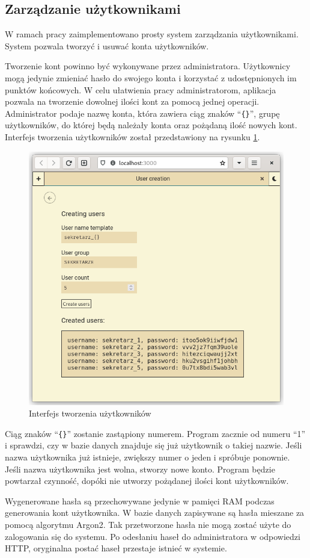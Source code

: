 \subsection{Zarządzanie użytkownikami}

W ramach pracy zaimplementowano prosty system zarządzania użytkownikami. System
pozwala tworzyć i usuwać konta użytkowników.

Tworzenie kont powinno być wykonywane przez administratora. Użytkownicy mogą
jedynie zmieniać hasło do swojego konta i korzystać z udostępnionych im punktów
końcowych. W celu ułatwienia pracy administratorom, aplikacja pozwala na
tworzenie dowolnej ilości kont za pomocą jednej operacji. Administrator podaje
nazwę konta, która zawiera ciąg znaków ``\verb|{}|'', grupę użytkowników, do
której będą należały konta oraz pożądaną ilość nowych kont. Interfejs tworzenia
użytkowników został przedstawiony na rysunku \ref{userCreationFigure}.

\begin{figure}[h]
    \centering
    \includegraphics[width=.7\textwidth]{./img/creating_users.png}
    \caption{Interfejs tworzenia użytkowników}
    \label{userCreationFigure}
\end{figure}

Ciąg znaków ``\verb|{}|'' zostanie zastąpiony numerem. Program zacznie od numeru
``1'' i sprawdzi, czy w bazie danych znajduje się już użytkownik o takiej
nazwie. Jeśli nazwa użytkownika już istnieje, zwiększy numer o jeden i spróbuje
ponownie. Jeśli nazwa użytkownika jest wolna, stworzy nowe konto. Program będzie
powtarzał czynność, dopóki nie utworzy pożądanej ilości kont użytkowników.

Wygenerowane hasła są przechowywane jedynie w pamięci RAM podczas generowania
kont użytkownika. W bazie danych zapisywane są hasła mieszane za pomocą
algorytmu Argon2. Tak przetworzone hasła nie mogą zostać użyte do zalogowania
się do systemu. Po odesłaniu haseł do administratora w odpowiedzi HTTP,
oryginalna postać haseł przestaje istnieć w systemie.

